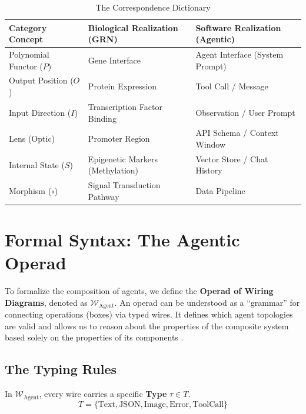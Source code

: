 \documentclass[11pt, a4paper]{article}
\newcommand{\Operad}{\mathcal{W}_{\text{Agent}}}
\begin{document}
\begin{table}[h]
    \centering
    \renewcommand{\arraystretch}{1.5}
    \begin{tabular}{|l|l|l|}
    \hline
    \textbf{Category Concept} & \textbf{Biological Realization (GRN)} & \textbf{Software Realization (Agentic)} \\ \hline
    Polynomial Functor ($P$) & Gene Interface & Agent Interface (System Prompt) \\ \hline
    Output Position ($O$) & Protein Expression & Tool Call / Message \\ \hline
    Input Direction ($I$) & Transcription Factor Binding & Observation / User Prompt \\ \hline
    Lens (Optic) & Promoter Region & API Schema / Context Window \\ \hline
    Internal State ($S$) & Epigenetic Markers (Methylation) & Vector Store / Chat History \\ \hline
    Morphism ($\circ$) & Signal Transduction Pathway & Data Pipeline \\ \hline
    \end{tabular}
    \caption{The Correspondence Dictionary}
    \label{tab:dictionary}
\end{table}

\section{Formal Syntax: The Agentic Operad}

To formalize the composition of agents, we define the \textbf{Operad of Wiring Diagrams}, denoted as $\Operad$. An operad can be understood as a ``grammar'' for connecting operations (boxes) via typed wires. It defines which agent topologies are valid and allows us to reason about the properties of the composite system based solely on the properties of its components \cite{vagner2015algebras}.

\subsection{The Typing Rules}
In $\Operad$, every wire carries a specific \textbf{Type} $\tau \in T$.
\begin{equation}
    T = \{ \text{Text}, \text{JSON}, \text{Image}, \text{Error}, \text{ToolCall} \}
\end{equation}
\end{document}
